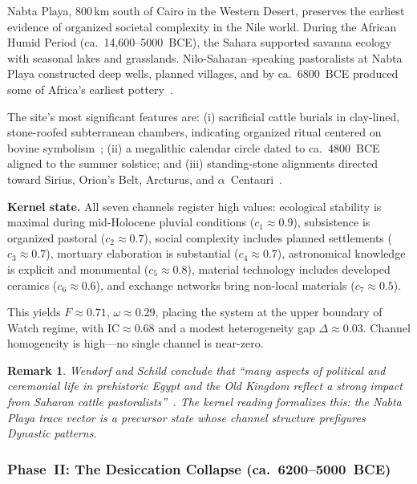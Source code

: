 \documentclass[
  aps,
  prd,
  twocolumn,
  superscriptaddress,
  nofootinbib,
  floatfix
]{revtex4-2}
\newtheorem{remark}{Remark}
\newcommand{\IC}{\mathrm{IC}}
\begin{document}
Nabta Playa, 800\,km south of Cairo in the Western
Desert, preserves the earliest evidence of organized
societal complexity in the Nile world.  During the
African Humid Period (ca.\ 14,600--5000~BCE), the
Sahara supported savanna ecology with seasonal lakes
and grasslands.  Nilo-Saharan--speaking pastoralists
at Nabta Playa constructed deep wells, planned
villages, and by ca.\ 6800~BCE produced some of
Africa's earliest pottery~\cite{wendorf2001holocene}.

The site's most significant features are: (i)
sacrificial cattle burials in clay-lined,
stone-roofed subterranean chambers, indicating
organized ritual centered on bovine
symbolism~\cite{wendorf1998late}; (ii) a megalithic
calendar circle dated to ca.\ 4800~BCE aligned to the
summer solstice; and (iii) standing-stone alignments
directed toward Sirius, Orion's Belt, Arcturus, and
$\alpha$~Centauri~\cite{malville1998megaliths}.

\textbf{Kernel state.}  All seven channels register
high values: ecological stability is maximal during
mid-Holocene pluvial conditions ($c_1 \approx 0.9$),
subsistence is organized pastoral ($c_2 \approx
0.7$), social complexity includes planned settlements
($c_3 \approx 0.7$), mortuary elaboration is
substantial ($c_4 \approx 0.7$), astronomical
knowledge is explicit and monumental ($c_5 \approx
0.8$), material technology includes developed ceramics
($c_6 \approx 0.6$), and exchange networks bring
non-local materials ($c_7 \approx 0.5$).

This yields $F \approx 0.71$, $\omega \approx 0.29$,
placing the system at the upper boundary of Watch
regime, with $\IC \approx 0.68$ and a modest
heterogeneity gap $\Delta \approx 0.03$.  Channel
homogeneity is high---no single channel is
near-zero.

\begin{remark}
Wendorf and Schild conclude that ``many aspects of
political and ceremonial life in prehistoric Egypt and
the Old Kingdom reflect a strong impact from Saharan
cattle pastoralists''~\cite{wendorf2001holocene}.
The kernel reading formalizes this: the Nabta Playa
trace vector is a \emph{precursor state} whose
channel structure prefigures Dynastic patterns.
\end{remark}


\subsubsection{Phase~II: The Desiccation Collapse
(ca.\ 6200--5000~BCE)}\label{sec:collapse}
\end{document}
